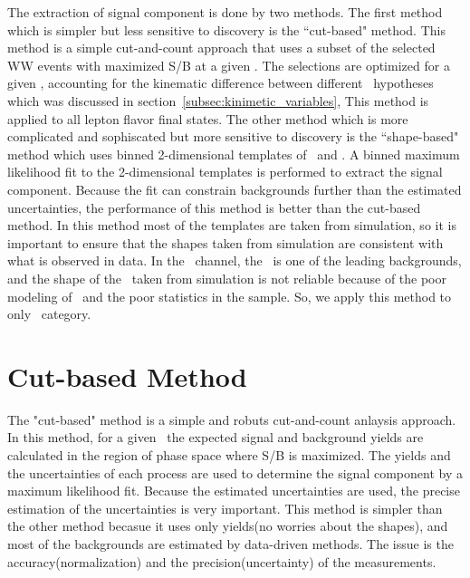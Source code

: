 The extraction of signal component is done by two methods. 
The first method which is simpler but less sensitive to discovery 
is the ``cut-based" method. This method is a simple cut-and-count approach 
that uses a subset of the selected WW events with maximized S/B at a given \mHi.
The selections are optimized for a given \mHi,
accounting for the kinematic difference between different \mHi\ hypotheses 
which was discussed in section~\ref{subsec:kinimetic_variables}, 
This method is applied to all lepton flavor final states. 
The other method which is more complicated and sophiscated but more sensitive to discovery 
is the ``shape-based" method which uses binned 2-dimensional templates of \mT\ and \mll. 
A binned maximum likelihood fit to the 2-dimensional templates is performed to extract 
the signal component. Because the fit can constrain backgrounds further than the estimated 
uncertainties, the performance of this method is better than the cut-based method. 
In this method most of the templates are taken from simulation,
so it is important to ensure that the shapes taken from simulation 
are consistent with what is observed in data. 
In the \SF\ channel, the \dyll\ is one of the leading backgrounds, and
the shape of the \dyll\ taken from simulation is not reliable because of the
poor modeling of \met\ and the poor statistics in the sample. So, we apply 
this method to only \DF\ category. 


\section{Cut-based Method}


The "cut-based" method is a simple and robuts cut-and-count anlaysis approach. 
In this method, for a given \mHi\ the expected signal and background yields are 
calculated in the region of phase space where S/B is maximized. 
The yields and the uncertainties of each process are used to determine 
the signal component by a maximum likelihood fit. 
Because the estimated uncertainties are used, the precise estimation
of the uncertainties is very important.  
This method is simpler than the other method becasue it uses only 
yields(no worries about the shapes), 
and most of the backgrounds are estimated by data-driven methods. 
The issue is the accuracy(normalization) and the precision(uncertainty) of the measurements.  

